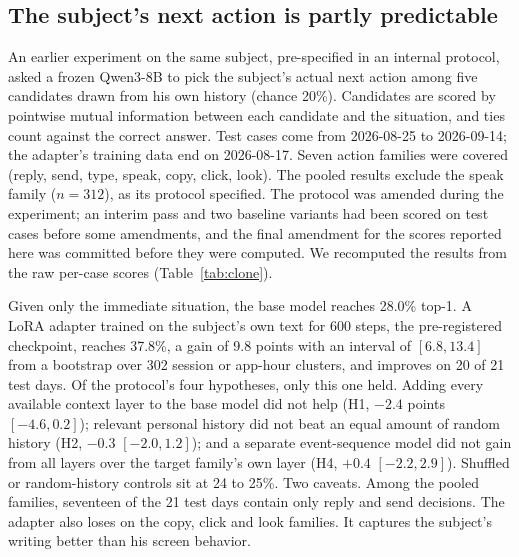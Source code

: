 \documentclass[11pt]{article}
\begin{document}
\subsection{The subject's next action is partly predictable}

An earlier experiment on the same subject, pre-specified in an internal protocol, asked a frozen Qwen3-8B to pick the subject's actual next action among five candidates drawn from his own history (chance 20\%). Candidates are scored by pointwise mutual information between each candidate and the situation, and ties count against the correct answer. Test cases come from 2026-08-25 to 2026-09-14; the adapter's training data end on 2026-08-17. Seven action families were covered (reply, send, type, speak, copy, click, look). The pooled results exclude the speak family ($n = 312$), as its protocol specified. The protocol was amended during the experiment; an interim pass and two baseline variants had been scored on test cases before some amendments, and the final amendment for the scores reported here was committed before they were computed. We recomputed the results from the raw per-case scores (Table~\ref{tab:clone}).

Given only the immediate situation, the base model reaches 28.0\% top-1. A LoRA adapter \citep{hu2022lora} trained on the subject's own text for 600 steps, the pre-registered checkpoint, reaches 37.8\%, a gain of 9.8 points with an interval of $[6.8, 13.4]$ from a bootstrap over 302 session or app-hour clusters, and improves on 20 of 21 test days. Of the protocol's four hypotheses, only this one held. Adding every available context layer to the base model did not help (H1, $-2.4$ points $[-4.6, 0.2]$); relevant personal history did not beat an equal amount of random history (H2, $-0.3$ $[-2.0, 1.2]$); and a separate event-sequence model did not gain from all layers over the target family's own layer (H4, $+0.4$ $[-2.2, 2.9]$). Shuffled or random-history controls sit at 24 to 25\%. Two caveats. Among the pooled families, seventeen of the 21 test days contain only reply and send decisions. The adapter also loses on the copy, click and look families. It captures the subject's writing better than his screen behavior.

\begin{table}[t]
\centering
\small

\caption{Five-way next-action prediction, pooled over six action families ($n = 1{,}695$), recomputed from raw per-case scores. Intervals are bootstraps over 302 session or app-hour clusters. Of four pre-specified hypotheses, only the personal adapter (L $>$ A) held.}
\label{tab:clone}
\end{table}
\end{document}
